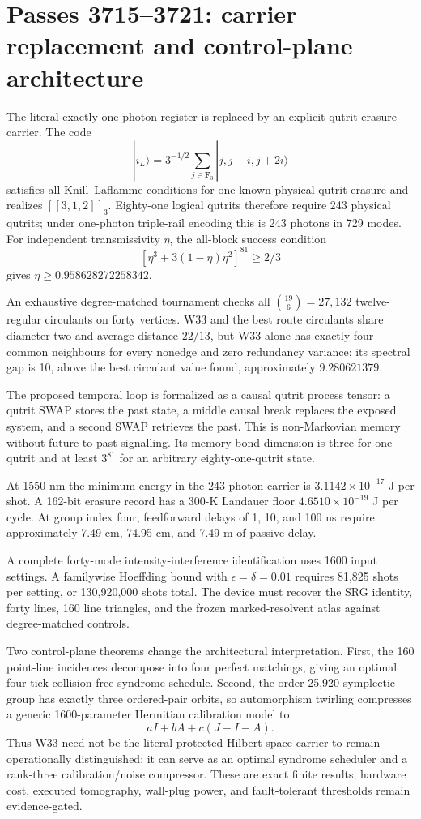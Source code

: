 \section{Passes 3715--3721: carrier replacement and control-plane architecture}

The literal exactly-one-photon register is replaced by an explicit qutrit erasure carrier.  The code
\[
 |i_L\rangle=3^{-1/2}\sum_{j\in\mathbf F_3}|j,j+i,j+2i\rangle
\]
satisfies all Knill--Laflamme conditions for one known physical-qutrit erasure and realizes $[[3,1,2]]_3$.  Eighty-one logical qutrits therefore require 243 physical qutrits; under one-photon triple-rail encoding this is 243 photons in 729 modes.  For independent transmissivity $\eta$, the all-block success condition
\[
 [\eta^3+3(1-\eta)\eta^2]^{81}\ge 2/3
\]
gives $\eta\ge0.958628272258342$.

An exhaustive degree-matched tournament checks all $\binom{19}{6}=27,132$ twelve-regular circulants on forty vertices.  W33 and the best route circulants share diameter two and average distance $22/13$, but W33 alone has exactly four common neighbours for every nonedge and zero redundancy variance; its spectral gap is 10, above the best circulant value found, approximately $9.280621379$.

The proposed temporal loop is formalized as a causal qutrit process tensor: a qutrit SWAP stores the past state, a middle causal break replaces the exposed system, and a second SWAP retrieves the past.  This is non-Markovian memory without future-to-past signalling.  Its memory bond dimension is three for one qutrit and at least $3^{81}$ for an arbitrary eighty-one-qutrit state.

At 1550 nm the minimum energy in the 243-photon carrier is $3.1142\times10^{-17}$ J per shot.  A 162-bit erasure record has a 300-K Landauer floor $4.6510\times10^{-19}$ J per cycle.  At group index four, feedforward delays of 1, 10, and 100 ns require approximately 7.49 cm, 74.95 cm, and 7.49 m of passive delay.

A complete forty-mode intensity-interference identification uses 1600 input settings.  A familywise Hoeffding bound with $\epsilon=\delta=0.01$ requires 81,825 shots per setting, or 130,920,000 shots total.  The device must recover the SRG identity, forty lines, 160 line triangles, and the frozen marked-resolvent atlas against degree-matched controls.

Two control-plane theorems change the architectural interpretation.  First, the 160 point-line incidences decompose into four perfect matchings, giving an optimal four-tick collision-free syndrome schedule.  Second, the order-25,920 symplectic group has exactly three ordered-pair orbits, so automorphism twirling compresses a generic 1600-parameter Hermitian calibration model to
\[
 aI+bA+c(J-I-A).
\]
Thus W33 need not be the literal protected Hilbert-space carrier to remain operationally distinguished: it can serve as an optimal syndrome scheduler and a rank-three calibration/noise compressor.  These are exact finite results; hardware cost, executed tomography, wall-plug power, and fault-tolerant thresholds remain evidence-gated.
